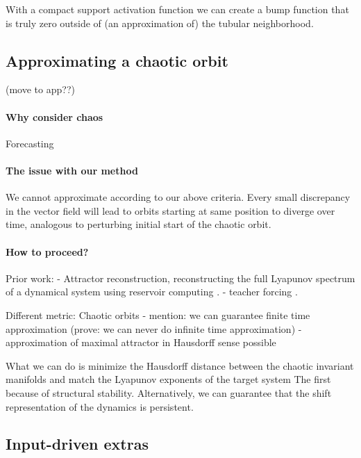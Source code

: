 \documentclass{article}
\newcommand{\ascomment}[1]{\textcolor{ascolor}{(#1)}}
\theoremstyle{definition} \newtheorem{definition}{Definition}
\theoremstyle{remark} \newtheorem{remark}{Remark}
\newcounter{ct}
\begin{document}
With a compact support activation function we can create a bump function that is truly zero outside of (an approximation of) the tubular neighborhood.


\subsection{Approximating a chaotic orbit}\label{sec:chaos} 
\ascomment{move to app??}
\paragraph{Why consider chaos} 
Forecasting
\citep{jaeger2004harnessing}
\citep{fan2020long}
\citep{vlachas2020backpropagation}
\citep{grigoryeva2024forecasting}

\paragraph{The issue with our method} 
We cannot approximate according to our above criteria.
Every small discrepancy in the vector field will lead to orbits starting at same position to diverge over time, analogous to perturbing initial start of the chaotic orbit.


\paragraph{How to proceed?}
Prior work:
- Attractor reconstruction, reconstructing the full Lyapunov spectrum of a dynamical system using reservoir computing \citep{hart2024attractor}.
- teacher forcing \citep{hess2023teacherforcing}.

Different metric: Chaotic orbits
- mention: we can guarantee finite time approximation (prove: we can never do infinite time approximation)
- approximation of maximal attractor in Hausdorff sense possible \citep{hess2023teacherforcing}

What we can do is minimize the Hausdorff distance between the chaotic invariant manifolds and match the Lyapunov exponents of the target system
The first because of structural stability.
%
Alternatively, we can guarantee that the shift representation of the dynamics is persistent.



\subsection{Input-driven extras}\label{sec:input_driven_app} 
\end{document}
